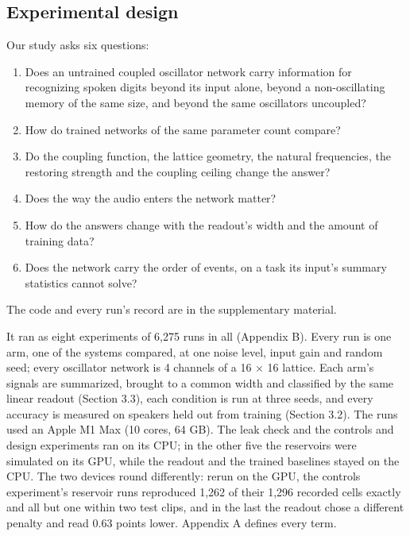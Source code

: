\documentclass[10pt]{article}
\providecommand{\tightlist}{%
  \setlength{\itemsep}{0pt}\setlength{\parskip}{0pt}}
\begin{document}
\subsection{Experimental design}\label{experimental-design-1}

Our study asks six questions:

\begin{enumerate}
\def\labelenumi{\arabic{enumi}.}
\tightlist
\item
  Does an untrained coupled oscillator network carry information for
  recognizing spoken digits beyond its input alone, beyond a
  non-oscillating memory of the same size, and beyond the same
  oscillators uncoupled?
\item
  How do trained networks of the same parameter count compare?
\item
  Do the coupling function, the lattice geometry, the natural
  frequencies, the restoring strength and the coupling ceiling change
  the answer?
\item
  Does the way the audio enters the network matter?
\item
  How do the answers change with the readout's width and the amount of
  training data?
\item
  Does the network carry the order of events, on a task its input's
  summary statistics cannot solve?
\end{enumerate}

The code and every run's record are in the supplementary material.

It ran as eight experiments of 6,275 runs in all (Appendix B). Every run
is one arm, one of the systems compared, at one noise level, input gain
and random seed; every oscillator network is 4 channels of a 16
\ensuremath{\times} 16 lattice. Each arm's signals are summarized,
brought to a common width and classified by the same linear readout
(Section 3.3), each condition is run at three seeds, and every accuracy
is measured on speakers held out from training (Section 3.2). The runs
used an Apple M1 Max (10 cores, 64 GB). The leak check and the controls
and design experiments ran on its CPU; in the other five the reservoirs
were simulated on its GPU, while the readout and the trained baselines
stayed on the CPU. The two devices round differently: rerun on the GPU,
the controls experiment's reservoir runs reproduced 1,262 of their 1,296
recorded cells exactly and all but one within two test clips, and in the
last the readout chose a different penalty and read 0.63 points lower.
Appendix A defines every term.
\end{document}
